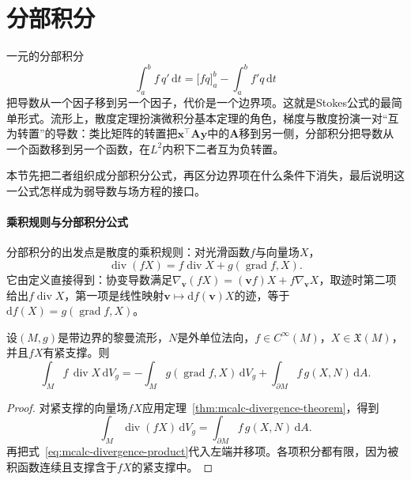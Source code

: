 \section{分部积分}
\label{sec:mcalc-integration-by-parts}

一元的分部积分
\[
\int_a^bf\,q'\,\mathrm dt=\bigl[fq\bigr]_a^b-\int_a^bf'q\,\mathrm dt
\]
把导数从一个因子移到另一个因子，代价是一个边界项。这就是Stokes公式的最简单形式。流形上，散度定理扮演微积分基本定理的角色，梯度与散度扮演一对“互为转置”的导数：类比矩阵的转置把$\bm x^\top\bm A\bm y$中的$\bm A$移到另一侧，分部积分把导数从一个函数移到另一个函数，在$L^2$内积下二者互为负转置。

本节先把二者组织成分部积分公式，再区分边界项在什么条件下消失，最后说明这一公式怎样成为弱导数与场方程的接口。

\paragraph{乘积规则与分部积分公式}
分部积分的出发点是散度的乘积规则：对光滑函数$f$与向量场$X$，
\begin{equation}
\operatorname{div}(fX)=f\operatorname{div}X+g(\operatorname{grad}f,X).
\label{eq:mcalc-divergence-product}
\end{equation}
它由定义直接得到：协变导数满足$\nabla_{\bm v}(fX)=(\bm vf)X+f\nabla_{\bm v}X$，取迹时第二项给出$f\operatorname{div}X$，第一项是线性映射$\bm v\mapsto\mathrm df(\bm v)X$的迹，等于$\mathrm df(X)=g(\operatorname{grad}f,X)$。

\begin{theorem}[分部积分公式]
\label{thm:mcalc-integration-by-parts}
设$(M,g)$是带边界的黎曼流形，$N$是外单位法向，$f\in C^\infty(M)$，$X\in\mathfrak X(M)$，并且$fX$有紧支撑。则
\begin{equation}
\int_Mf\,\operatorname{div}X\,\mathrm dV_g=-\int_Mg(\operatorname{grad}f,X)\,\mathrm dV_g+\int_{\partial M}f\,g(X,N)\,\mathrm dA .
\label{eq:mcalc-integration-by-parts}
\end{equation}
\end{theorem}

\begin{proof}
对紧支撑的向量场$fX$应用定理~\ref{thm:mcalc-divergence-theorem}，得到
\[
\int_M\operatorname{div}(fX)\,\mathrm dV_g=\int_{\partial M}f\,g(X,N)\,\mathrm dA .
\]
再把式~\eqref{eq:mcalc-divergence-product}代入左端并移项。各项积分都有限，因为被积函数连续且支撑含于$fX$的紧支撑中。
\end{proof}

